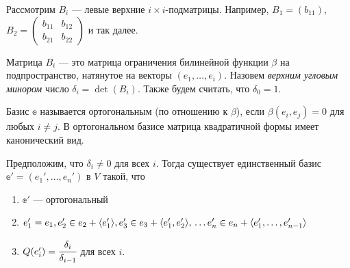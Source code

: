 Рассмотрим $B_i$ --- левые верхние $i\times i$-подматрицы. Например, $B_1 = (b_{11})$, $B_2 = \begin{pmatrix}
	b_{11}& b_{12}\\
	b_{21}& b_{22}
\end{pmatrix}$
и так далее.
\par Матрица $B_i$ --- это матрица ограничения билинейной функции $\beta$ на подпространство, натянутое на векторы $(e_1, \ldots, e_i)$. Назовем \textit{верхним угловым минором} число $\delta_i = \det(B_i)$. Также будем считать, что $\delta_0 = 1$. 
\begin{Def}
	Базис $\mathbb{e}$ называется ортогональным (по отношению к $\beta$), если $\beta(e_i, e_j) = 0$ для любых $i \neq j$. В ортогональном базисе матрица квадратичной формы имеет канонический вид.
\end{Def}
\begin{Theorem}
		Предположим, что $\delta_i \neq 0$ для всех $i$. Тогда существует единственный  базис $\mathbb{e}' = (e_1', \ldots, e_n')$ в $V$ такой, что
		\begin{enumerate}
			\item $\mathbb{e}'$ --- ортогональный
			\item $e_1' = e_1,\\ e_2' \in e_2 + \langle e_1'\rangle,\\ e_3' \in  e_3 + \langle e_1', e_2' \rangle,\\ \ldots\\ e_n' \in  e_n + \langle e_1', \ldots, e_{n-1}'\rangle$
			\item $Q(e_i') = \cfrac{\delta_i}{\delta_{i-1}}$ для всех $i$.
		\end{enumerate}	
\end{Theorem}
